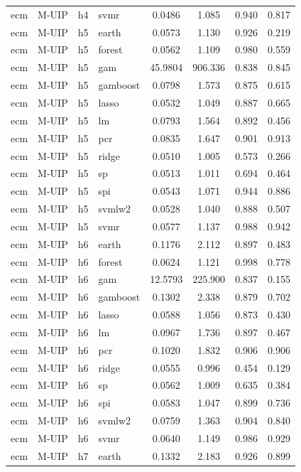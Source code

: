 \begin{ThreePartTable}
\begin{longtable}[t]{llclcccc}
ecm & M-UIP & h4 & svmr & 0.0486 & 1.085 & 0.940 & 0.817\\
\addlinespace
ecm & M-UIP & h5 & earth & 0.0573 & 1.130 & 0.926 & 0.219\\
ecm & M-UIP & h5 & forest & 0.0562 & 1.109 & 0.980 & 0.559\\
ecm & M-UIP & h5 & gam & 45.9804 & 906.336 & 0.838 & 0.845\\
ecm & M-UIP & h5 & gamboost & 0.0798 & 1.573 & 0.875 & 0.615\\
ecm & M-UIP & h5 & lasso & 0.0532 & 1.049 & 0.887 & 0.665\\
ecm & M-UIP & h5 & lm & 0.0793 & 1.564 & 0.892 & 0.456\\
ecm & M-UIP & h5 & pcr & 0.0835 & 1.647 & 0.901 & 0.913\\
ecm & M-UIP & h5 & ridge & 0.0510 & 1.005 & 0.573 & 0.266\\
ecm & M-UIP & h5 & sp & 0.0513 & 1.011 & 0.694 & 0.464\\
ecm & M-UIP & h5 & spi & 0.0543 & 1.071 & 0.944 & 0.886\\
ecm & M-UIP & h5 & svmlw2 & 0.0528 & 1.040 & 0.888 & 0.507\\
ecm & M-UIP & h5 & svmr & 0.0577 & 1.137 & 0.988 & 0.942\\
\addlinespace
ecm & M-UIP & h6 & earth & 0.1176 & 2.112 & 0.897 & 0.483\\
ecm & M-UIP & h6 & forest & 0.0624 & 1.121 & 0.998 & 0.778\\
ecm & M-UIP & h6 & gam & 12.5793 & 225.900 & 0.837 & 0.155\\
ecm & M-UIP & h6 & gamboost & 0.1302 & 2.338 & 0.879 & 0.702\\
ecm & M-UIP & h6 & lasso & 0.0588 & 1.056 & 0.873 & 0.430\\
ecm & M-UIP & h6 & lm & 0.0967 & 1.736 & 0.897 & 0.467\\
ecm & M-UIP & h6 & pcr & 0.1020 & 1.832 & 0.906 & 0.906\\
ecm & M-UIP & h6 & ridge & 0.0555 & 0.996 & 0.454 & 0.129\\
ecm & M-UIP & h6 & sp & 0.0562 & 1.009 & 0.635 & 0.384\\
ecm & M-UIP & h6 & spi & 0.0583 & 1.047 & 0.899 & 0.736\\
ecm & M-UIP & h6 & svmlw2 & 0.0759 & 1.363 & 0.904 & 0.840\\
ecm & M-UIP & h6 & svmr & 0.0640 & 1.149 & 0.986 & 0.929\\
\addlinespace
ecm & M-UIP & h7 & earth & 0.1332 & 2.183 & 0.926 & 0.899\\

\end{longtable}
\end{ThreePartTable}
